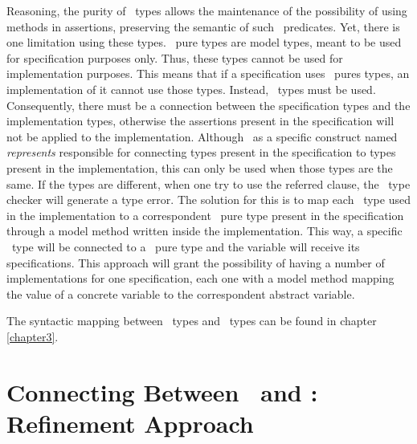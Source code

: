 Reasoning, the purity of \jml\ types allows the maintenance of the possibility of using methods in assertions, preserving the semantic of such \vpp\ predicates. Yet, there is one limitation using these types. \jml\ pure types are model types, meant to be used for specification purposes only. Thus, these types cannot be used for implementation purposes. This means that if a specification uses \jml\ pures types, an implementation of it cannot use those types. Instead, \java\ types must be used. Consequently, there must be a connection between the specification types and the implementation types, otherwise the assertions present in the specification will not be applied to the implementation. Although \jml\ as a specific construct named \textit{represents} responsible for connecting types present in the specification to types present in the implementation, this can only be used when those types are the same. If the types are different, when one try to use the referred clause, the \jml\ type checker will generate a type error. The solution for this is to map each \java\ type used in the implementation to a correspondent \jml\ pure type present in the specification through a model method written inside the implementation. This way, a specific \java\ type will be connected to a \jml\ pure type and the variable will receive its specifications. 
This approach will grant the possibility of having a number of implementations for one specification, each one with a model method mapping the value of a concrete variable to the correspondent abstract variable.

The syntactic mapping between \vpp\ types and \jml\ types can be found in chapter \ref{chapter3}.

\section{Connecting Between \vpp\ and \jml : Refinement Approach}
\label{chapter2:sec:vpptojmlref}

